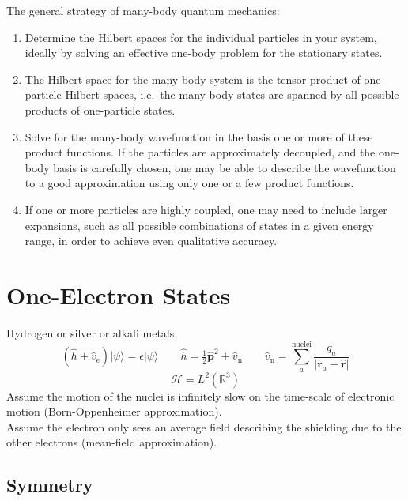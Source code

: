 The general strategy of many-body quantum mechanics:
\begin{enumerate}
    \item
        Determine the Hilbert spaces for the individual particles in your
        system, ideally by solving an effective one-body problem for the
        stationary states.
    \item
        The Hilbert space for the many-body system is the tensor-product of
        one-particle Hilbert spaces, i.e.~the many-body states are spanned by
        all possible products of one-particle states.
    \item
        Solve for the many-body wavefunction in the basis one or more of these
        product functions.
        If the particles are approximately decoupled, and the one-body basis is
        carefully chosen, one may be able to describe the wavefunction to a good
        approximation using only one or a few product functions.
    \item
        If one or more particles are highly coupled, one may need to include
        larger expansions, such as all possible combinations of states in a
        given energy range, in order to achieve even qualitative accuracy.
\end{enumerate}

\section{One-Electron States}

Hydrogen or silver or alkali metals
\begin{equation}
    (\hat{h} + \hat{v}_\mathrm{e})
    |\psi\rangle
    =
    \epsilon
    |\psi\rangle
    \qquad
    \hat{h}
    =
    \tfrac{1}{2}
    \hat{\mathbf{p}}^2
    +
    \hat{v}_\mathrm{n}
    \qquad
    \hat{v}_\mathrm{n}
    =
    \sum_a^{\mathrm{nuclei}}
    \frac{q_a}{|\mathbf{r}_a-\hat{\mathbf{r}}|}
\end{equation}
\begin{equation}
    \mathcal{H}
    =
    L^2(\mathbb{R}^3)
\end{equation}
Assume the motion of the nuclei is infinitely slow on the time-scale of
electronic motion (Born-Oppenheimer approximation).\\
Assume the electron only sees an average field describing the shielding due to
the other electrons (mean-field approximation).

\subsection{Symmetry}

